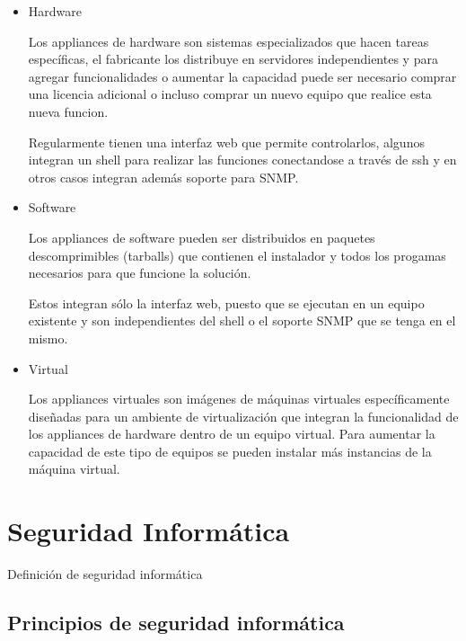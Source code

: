 \begin{itemize}

  \item Hardware
  
Los appliances de hardware son sistemas especializados que hacen tareas espec\'{i}ficas, el fabricante los distribuye en servidores independientes y para agregar funcionalidades o aumentar la capacidad puede ser necesario comprar una licencia adicional o incluso comprar un nuevo equipo que realice esta nueva funcion.

Regularmente tienen una interfaz web que permite controlarlos, algunos integran un shell para realizar las funciones conectandose a trav\'{e}s de ssh y en otros casos integran adem\'{a}s soporte para SNMP.
\cite{dcd32ad713054f2f67fbcd17c0900928}

  \item Software
  
Los appliances de software pueden ser distribuidos en paquetes descomprimibles (tarballs) que contienen el instalador y todos los progamas necesarios para que funcione la soluci\'{o}n.

Estos integran s\'{o}lo la interfaz web, puesto que se ejecutan en un equipo existente y son independientes del shell o el soporte SNMP que se tenga en el mismo.
\cite{4cb5bff4c029d86b328a2126e8a3060f}
  
  \item Virtual 

Los appliances virtuales son im\'{a}genes de m\'{a}quinas virtuales espec\'{i}ficamente dise\~{n}adas para un ambiente de virtualizaci\'{o}n que integran la funcionalidad de los appliances de hardware dentro de un equipo virtual. Para aumentar la capacidad de este tipo de equipos se pueden instalar m\'{a}s instancias de la m\'{a}quina virtual.

\cite{314f38cbb73bf967a21191775959cf1d}
  
\end{itemize}

\section {Seguridad Inform\'{a}tica}
    
Definici\'{o}n de seguridad inform\'{a}tica

  \subsection {Principios de seguridad inform\'{a}tica}

